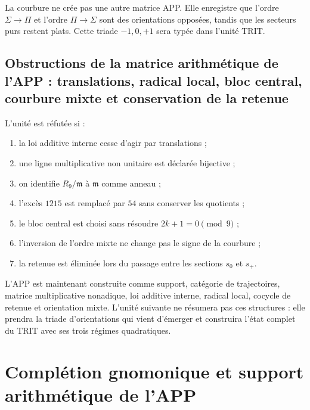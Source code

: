 La courbure ne crée pas une autre matrice APP. Elle enregistre que l’ordre
\(\Sigma\to\Pi\) et l’ordre \(\Pi\to\Sigma\) sont des orientations opposées,
tandis que les secteurs purs restent plats. Cette triade
\(-1,0,+1\) sera typée dans l’unité TRIT.

\subsection{Obstructions de la matrice arithmétique de l’APP : translations, radical local, bloc central, courbure mixte et conservation de la retenue}

\begin{criterion}
L’unité est réfutée si :
\begin{enumerate}
 \item la loi additive interne cesse d’agir par translations ;
 \item une ligne multiplicative non unitaire est déclarée bijective ;
 \item on identifie \(R_9/\mathfrak m\) à \(\mathfrak m\) comme anneau ;
 \item l’excès \(1215\) est remplacé par \(54\) sans conserver les quotients ;
 \item le bloc central est choisi sans résoudre \(2k+1=0\pmod9\) ;
 \item l’inversion de l’ordre mixte ne change pas le signe de la courbure ;
 \item la retenue est éliminée lors du passage entre les sections \(s_0\) et
       \(s_+\).
\end{enumerate}
\end{criterion}

L’APP est maintenant construite comme support, catégorie de trajectoires, matrice
multiplicative nonadique, loi additive interne, radical local, cocycle de
retenue et orientation mixte. L’unité
suivante ne résumera pas ces structures : elle prendra la triade d’orientations
qui vient d’émerger et construira l’état complet du TRIT avec ses trois régimes
quadratiques.



\section{Complétion gnomonique et support arithmétique de l’APP}
\label{p12-83-c1-s2:chap:app-completacion-gnomonica}

